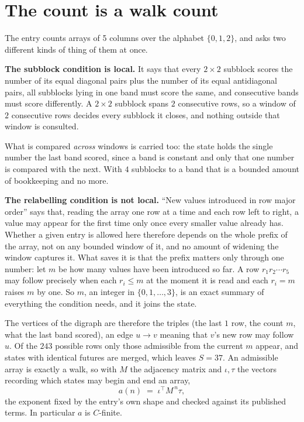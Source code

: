 \documentclass[11pt,a4paper]{article}
\theoremstyle{plain}
\theoremstyle{definition}
\begin{document}
\section{The count is a walk count}

The entry counts arrays of 5 columns over the alphabet $\{0,1,2\}$, and asks two different kinds of thing of them at once.

\textbf{The subblock condition is local.} It says that every $2\times2$ subblock scores the number of its equal diagonal pairs plus the number of its equal antidiagonal pairs, all subblocks lying in one band must score the same, and consecutive bands must score differently. A $ 2\times2$ subblock spans $2$ consecutive rows, so a window of $2$ consecutive rows decides every subblock it closes, and nothing outside that window is consulted.

What is compared \emph{across} windows is carried too: the state holds the single number the last band scored, since a band is constant and only that one number is compared with the next. With $4$ subblocks to a band that is a bounded amount of bookkeeping and no more.

\textbf{The relabelling condition is not local.} ``New values introduced in row major order'' says that, reading the array one row at a time and each row left to right, a value may appear for the first time only once every smaller value already has. Whether a given entry is allowed here therefore depends on the whole prefix of the array, not on any bounded window of it, and no amount of widening the window captures it. What saves it is that the prefix matters only through one number: let $m$ be how many values have been introduced so far. A row $r_1r_2\cdots r_5$ may follow precisely when each $r_i\le m$ at the moment it is read and each $r_i=m$ raises $m$ by one. So $m$, an integer in $\{0,1,\dots,3\}$, is an exact summary of everything the condition needs, and it joins the state.

The vertices of the digraph are therefore the triples (the last $1$ row, the count $m$, what the last band scored), an edge $u\to v$ meaning that $v$'s new row may follow $u$. Of the $243$ possible rows only those admissible from the current $m$ appear, and states with identical futures are merged, which leaves $S=37$. An admissible array is exactly a walk, so with $M$ the adjacency matrix and $\iota,\tau$ the vectors recording which states may begin and end an array,
\[
a(n)\;=\;\iota^{\!\top}M^{\,n}\tau ,
\]
the exponent fixed by the entry's own shape and checked against its published terms. In
particular $a$ is $C$-finite.
\end{document}
